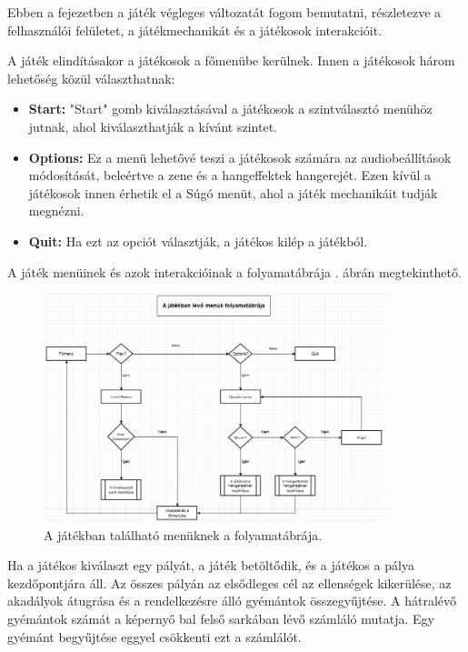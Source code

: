 
Ebben a fejezetben a játék végleges változatát fogom bemutatni, részletezve a felhasználói felületet, a játékmechanikát és a játékosok interakcióit.

A játék elindításakor a játékosok a főmenübe kerülnek. Innen a játékosok három lehetőség közül választhatnak:
\begin{itemize}
\item \textbf{Start:} "Start" gomb kiválasztásával a játékosok a szintválasztó menühöz jutnak, ahol kiválaszthatják a kívánt szintet.
\item \textbf{Options:} Ez a menü lehetővé teszi a játékosok számára az audiobeállítások módosítását, beleértve a zene és a hangeffektek hangerejét. Ezen kívül a játékosok innen érhetik el a Súgó menüt, ahol a játék mechanikáit tudják megnézni.
\item \textbf{Quit:} Ha ezt az opciót választják, a játékos kilép a játékból.
\end{itemize}

A játék menüinek és azok interakcióinak a folyamatábrája . ábrán megtekinthető.

\begin{figure}[ht]
\centering
\includegraphics[width=0.9\textwidth]{images/menuflowchart.png}
\caption{A játékban található menüknek a folyamatábrája.}
\label{fig:menuflowchart}
\end{figure}

Ha a játékos kiválaszt egy pályát, a játék betöltődik, és a játékos a pálya kezdőpontjára áll. Az összes pályán az elsődleges cél az ellenségek kikerülése, az akadályok átugrása és a rendelkezésre álló gyémántok összegyűjtése. A hátralévő gyémántok számát a képernyő bal felső sarkában lévő számláló mutatja. Egy gyémánt begyűjtése eggyel csökkenti ezt a számlálót.


